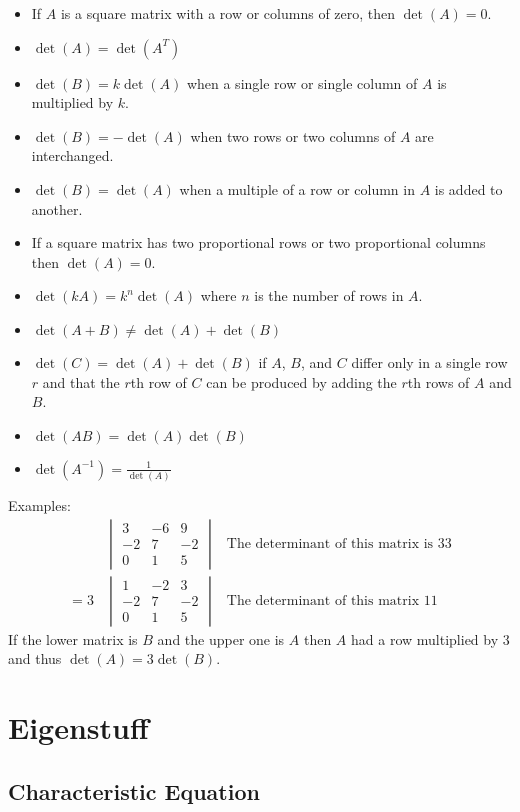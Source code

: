 \documentclass[12pt]{article}
\begin{document}
\begin{itemize}
    \item If $A$ is a square matrix with a row or columns of zero, then $\det(A) = 0$.
    \item $\det(A) = \det(A^T)$
    \item $\det(B) = k\det(A)$ when a single row or single column of $A$ is multiplied by $k$.
    \item $\det(B) = -\det(A)$ when two rows or two columns of $A$ are interchanged.
    \item $\det(B) = \det(A)$ when a multiple of a row or column in $A$ is added to another.
    \item If a square matrix has two proportional rows or two proportional columns then $\det(A) = 0$.
    \item $\det(kA) = k^n\det(A)$ where $n$ is the number of rows in $A$.
    \item $\det(A + B) \neq \det(A) + \det(B)$
    \item $\det(C) = \det(A) + \det(B)$ if $A$, $B$, and $C$ differ only in a single row $r$ and that the $r$th row of $C$ can be produced by adding the $r$th rows of $A$ and $B$.
    \item $\det(AB) = \det(A)\det(B)$
    \item $\det(A^{-1}) = \frac{1}{\det(A)}$
\end{itemize}
Examples:
\begin{align*}
    &\begin{vmatrix}3&-6&9\\-2&7&-2\\0&1&5\end{vmatrix}&\text{The determinant of this matrix is 33}\\
        =3&\begin{vmatrix}1&-2&3\\-2&7&-2\\0&1&5\end{vmatrix}&\text{The determinant of this matrix 11}
\end{align*}
If the lower matrix is $B$ and the upper one is $A$ then $A$ had a row multiplied by $3$ and thus $\det(A) = 3\det(B)$.


\section{Eigenstuff}


\subsection{Characteristic Equation}
\end{document}
